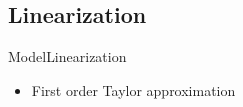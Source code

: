 \subsection{Linearization}
\begin{frame}{Model}{Linearization}
    \begin{itemize}
        \item First order Taylor approximation
    \end{itemize}


\end{frame}
